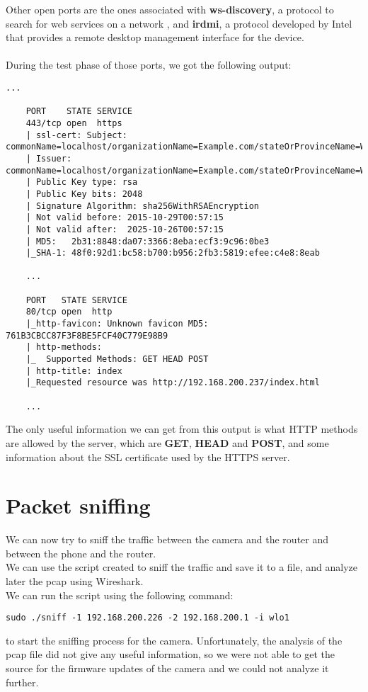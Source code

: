 Other open ports are the ones associated with
\textbf{ws-discovery}, a protocol to search for web services on
a network \cite{ws-discovery}, and \textbf{irdmi}, a protocol developed
by Intel that provides a remote desktop management interface for
the device.\\\\
During the test phase of those ports, we got the following output:
\begin{lstlisting}[numbers=none]
    ... 

    PORT    STATE SERVICE
    443/tcp open  https
    | ssl-cert: Subject: commonName=localhost/organizationName=Example.com/stateOrProvinceName=Washington/countryName=US
    | Issuer: commonName=localhost/organizationName=Example.com/stateOrProvinceName=Washington/countryName=US
    | Public Key type: rsa
    | Public Key bits: 2048
    | Signature Algorithm: sha256WithRSAEncryption
    | Not valid before: 2015-10-29T00:57:15
    | Not valid after:  2025-10-26T00:57:15
    | MD5:   2b31:8848:da07:3366:8eba:ecf3:9c96:0be3
    |_SHA-1: 48f0:92d1:bc58:b700:b956:2fb3:5819:efee:c4e8:8eab

    ... 

    PORT   STATE SERVICE
    80/tcp open  http
    |_http-favicon: Unknown favicon MD5: 761B3CBCC87F3F8BE5FCF40C779E98B9
    | http-methods: 
    |_  Supported Methods: GET HEAD POST
    | http-title: index
    |_Requested resource was http://192.168.200.237/index.html

    ... 
\end{lstlisting}
The only useful information we can get from this output is what
HTTP methods are allowed by the server, which are \textbf{GET}, \textbf{HEAD} and \textbf{POST}, 
and some information about the SSL certificate used by the HTTPS server.\\
\section{Packet sniffing}
We can now try to sniff the traffic between the camera and the router and between
the phone and the router.\\
We can use the script created to sniff the traffic and save it to a file, and
analyze later the pcap using Wireshark.\\
We can run the script using the following command:
\begin{lstlisting}[numbers=none]
    sudo ./sniff -1 192.168.200.226 -2 192.168.200.1 -i wlo1
\end{lstlisting}
to start the sniffing process for the camera. Unfortunately, the analysis of the
pcap file did not give any useful information, so we were not able to get the source
for the firmware updates of the camera and we could not analyze it further. 
\newpage